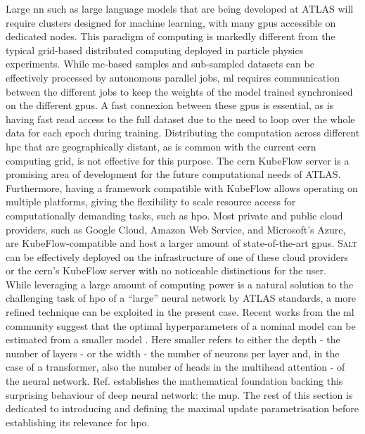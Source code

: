 Large \gls{nn} such as large language models that are being developed at ATLAS will require clusters designed for machine learning, with many \glspl{gpu} accessible on dedicated nodes. This paradigm of computing is markedly different from the typical grid-based distributed computing deployed in particle physics experiments. While \gls{mc}-based samples and sub-sampled datasets can be effectively processed by autonomous parallel jobs, \gls{ml} requires communication between the different jobs to keep the weights of the model trained synchronised on the different \glspl{gpu}. A fast connexion between these \glspl{gpu} is essential, as is having fast read access to the full dataset due to the need to loop over the whole data for each epoch during training. Distributing the computation across different \gls{hpc} that are geographically distant, as is common with the current \gls{cern} computing grid, is not effective for this purpose. The \gls{cern} KubeFlow server is a promising area of development for the future computational needs of ATLAS. Furthermore, having a framework compatible with KubeFlow allows operating on multiple platforms, giving the flexibility to scale resource access for computationally demanding tasks, such as \gls{hpo}. Most private and public cloud providers, such as Google Cloud, Amazon Web Service, and Microsoft's Azure, are KubeFlow-compatible and host a larger amount of state-of-the-art \glspl{gpu}. \textsc{Salt} can be effectively deployed on the infrastructure of one of these cloud providers or the \gls{cern}'s KubeFlow server with no noticeable distinctions for the user. \\

While leveraging a large amount of computing power is a natural solution to the challenging task of \gls{hpo} of a ``large'' neural network by ATLAS standards, a more refined technique can be exploited in the present case. Recent works from the \gls{ml} community suggest that the optimal hyperparameters of a nominal model can be estimated from a smaller model \cite{yang2021tuning}. Here smaller refers to either the depth - the number of layers - or the width - the number of neurons per layer and, in the case of a transformer, also the number of heads in the multihead attention - of the neural network. Ref. \cite{pmlr-v139-yang21c} establishes the mathematical foundation backing this surprising behaviour of deep neural network: the \gls{mup}. The rest of this section is dedicated to introducing and defining the maximal update parametrisation before establishing its relevance for \gls{hpo}. \\

